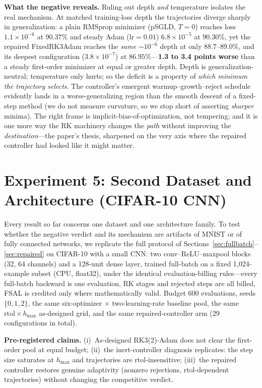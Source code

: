 \documentclass{article}
\begin{document}
\textbf{What the negative reveals.} Ruling out depth \emph{and} temperature isolates the real mechanism. At matched training-loss depth the trajectories diverge sharply in generalization: a plain RMSprop minimizer (pSGLD, $T = 0$) reaches loss $1.1\times 10^{-6}$ at $\mathbf{90.37\%}$ and steady Adam ($\mathrm{lr}{=}0.01$) $6.8\times 10^{-5}$ at $90.30\%$, yet the repaired FixedRK3Adam reaches the \emph{same} ${\sim}10^{-6}$ depth at only $88.7$--$89.0\%$, and its deepest configuration ($3.8\times 10^{-7}$) at $86.95\%$---\textbf{1.3 to 3.4 points worse} than a steady first-order minimizer at equal or greater depth. Depth is generalization-neutral; temperature only hurts; so the deficit is a property of \emph{which minimum the trajectory selects}. The controller's emergent warmup--growth--reject schedule evidently lands in a worse-generalizing region than the smooth descent of a fixed-step method (we do not measure curvature, so we stop short of asserting \emph{sharper} minima). The right frame is implicit-bias-of-optimization, not tempering; and it is one more way the RK machinery changes the \emph{path} without improving the \emph{destination}---the paper's thesis, sharpened on the very axis where the repaired controller had looked like it might matter.

\section{Experiment 5: Second Dataset and Architecture (CIFAR-10 CNN)}
\label{sec:cifar}

Every result so far concerns one dataset and one architecture family. To test whether the negative verdict and its mechanism are artifacts of MNIST or of fully connected networks, we replicate the full protocol of Sections~\ref{sec:fullbatch}--\ref{sec:repaired} on CIFAR-10 with a small CNN: two conv--ReLU--maxpool blocks (32, 64 channels) and a 128-unit dense layer, trained full-batch on a fixed 1{,}024-example subset (CPU, float32), under the identical evaluation-billing rules---every full-batch backward is one evaluation, RK stages and rejected steps are all billed, FSAL is credited only where mathematically valid. Budget 600 evaluations, seeds $\{0,1,2\}$, the same six-optimizer $\times$ two-learning-rate baseline pool, the same $\mathrm{rtol} \times h_{\max}$ as-designed grid, and the same repaired-controller arm (29 configurations in total).

\textbf{Pre-registered claims.} (i)~As-designed RK3(2)-Adam does not clear the first-order pool at equal budget; (ii)~the inert-controller diagnosis replicates: the step size saturates at $h_{\max}$ and trajectories are rtol-insensitive; (iii)~the repaired controller restores genuine adaptivity (nonzero rejections, rtol-dependent trajectories) without changing the competitive verdict.
\end{document}
